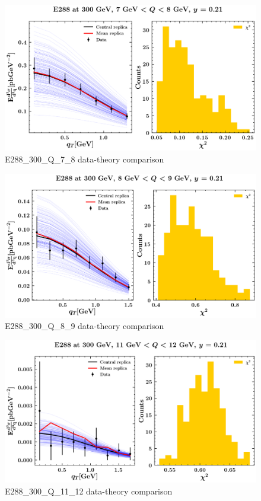 \documentclass[
]{article}
\begin{document}
\begin{figure}
\centering
\includegraphics{pngplots/E288_300_Q_7_8.png}
\caption{E288\_300\_Q\_7\_8 data-theory comparison}
\end{figure}

\begin{figure}
\centering
\includegraphics{pngplots/E288_300_Q_8_9.png}
\caption{E288\_300\_Q\_8\_9 data-theory comparison}
\end{figure}

\begin{figure}
\centering
\includegraphics{pngplots/E288_300_Q_11_12.png}
\caption{E288\_300\_Q\_11\_12 data-theory comparison}
\end{figure}
\end{document}

